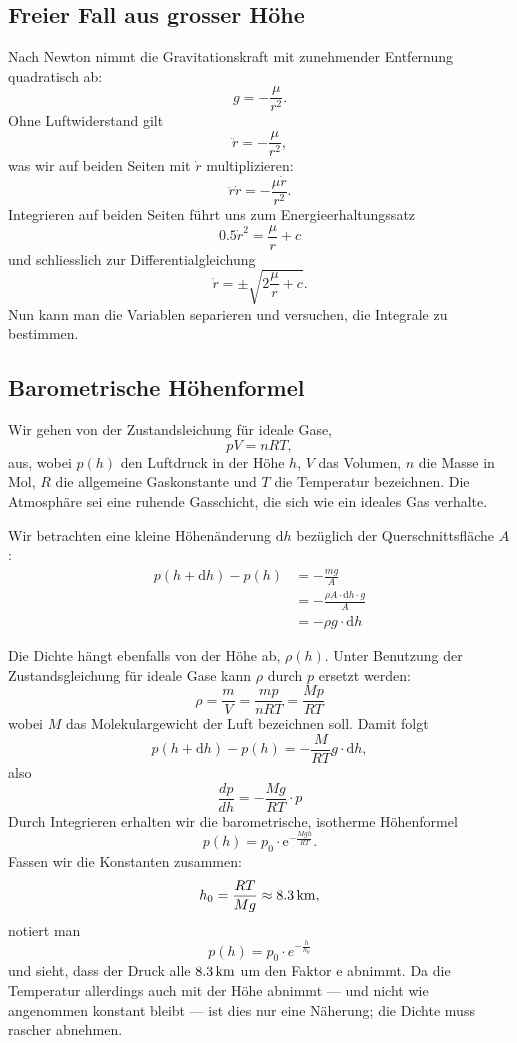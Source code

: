\documentclass[%
11pt,%
twoside,%
titlepage,%
swissgerman,%
headsepline%
]{scrartcl}
\theoremstyle{definition}
\theoremstyle{plain}
\begin{document}
\subsection{Freier Fall aus grosser Höhe}

Nach Newton nimmt die Gravitationskraft mit zunehmender Entfernung quadratisch ab:
$$g=-\frac{\mu}{r^2}.$$
Ohne Luftwiderstand gilt
$$\ddot{r}=-\frac{\mu}{r^2},$$
was wir auf beiden Seiten mit $\dot{r}$ multiplizieren:
$$\ddot{r}\dot{r}=-\frac{\mu\dot{r}}{r^2}.$$
Integrieren auf beiden Seiten führt uns zum Energieerhaltungssatz
$$0.5\dot{r}^2=\frac{\mu}{r}+c$$
und schliesslich zur Differentialgleichung
$$\dot{r}=\pm\sqrt{2\frac{\mu}{r}+c}.$$
Nun kann man die Variablen separieren und versuchen, die Integrale zu bestimmen.

\subsection{Barometrische Höhenformel}

Wir
gehen von der Zustandsleichung für ideale Gase,
$$pV=nRT,$$
aus, wobei $p(h)$ den Luftdruck in der Höhe $h$, $V$ das Volumen, $n$ die Masse in Mol, $R$ die allgemeine Gaskonstante und $T$ die Temperatur bezeichnen. Die Atmosphäre sei eine ruhende Gasschicht, die sich wie ein ideales Gas verhalte.

Wir betrachten eine kleine Höhenänderung $\mathrm{d}h$ bezüglich der Querschnittsfläche $A$:
\begin{align*}
    p(h+\mathrm{d}h)-p(h) &= -\frac{mg}{A}\\
    &= -\frac{\rho A\cdot \mathrm{d}h\cdot g}{A}\\
    &= -\rho g\cdot \mathrm{d}h
\end{align*}

Die Dichte hängt ebenfalls von der Höhe ab, $\rho(h)$. Unter Benutzung der Zustandsgleichung für ideale Gase kann $\rho$ durch $p$ ersetzt werden:
$$\rho=\frac{m}{V}=\frac{mp}{nRT}=\frac{Mp}{RT}$$
wobei $M$ das Molekulargewicht der Luft bezeichnen soll. Damit folgt
$$p(h+\mathrm{d}h)-p(h)=-\frac{M}{RT}g\cdot \mathrm{d}h,$$
also
$$\frac{dp}{dh}=-\frac{Mg}{RT}\cdot p$$
Durch Integrieren erhalten wir die barometrische, isotherme Höhenformel
$$p(h)=p_0\cdot \mathrm{e}^{-\frac{Mgh}{RT}}.$$
Fassen wir die Konstanten zusammen:
$$h_0=\frac{RT}{Mg}\approx\unit[8.3]{km},$$
notiert man
$$p(h)=p_0\cdot e^{-\frac{h}{h_0}}$$
und sieht, dass der Druck alle $\unit[8.3]{km}$ um den Faktor $\mathrm{e}$ abnimmt. Da die Temperatur allerdings auch mit der Höhe abnimmt --- und nicht wie angenommen konstant bleibt --- ist dies nur eine Näherung; die Dichte muss rascher abnehmen.
\end{document}

